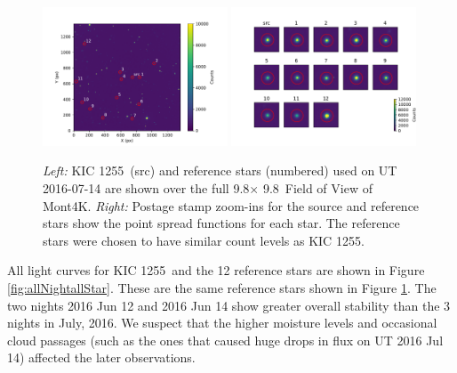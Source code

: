 \documentclass[preprint]{aastex61}
\newcommand{\shStar}{KIC 1255}
\begin{document}
\begin{figure}
\begin{centering}
\includegraphics[width=0.49\textwidth]{images/ut2016_07_14_clouds/figure_index_152.pdf}
\includegraphics[width=0.49\textwidth]{images/stamps_kic1255_UT2016_07_14.pdf}
\caption{{\it Left:} \shStar\ (src) and reference stars (numbered) used on UT 2016-07-14 are shown over the full 9.8\arcmin $\times$ 9.8\arcmin\ Field of View of Mont4K.
{\it Right:} Postage stamp zoom-ins for the source and reference stars show the point spread functions for each star.
The reference stars were chosen to have similar count levels as \shStar.
}\label{fig:refStars}
\end{centering}
\end{figure}

All light curves for \shStar\ and the 12 reference stars are shown in Figure \ref{fig:allNightallStar}.
These are the same reference stars shown in Figure \ref{fig:refStars}.
The two nights 2016 Jun 12 and 2016 Jun 14 show greater overall stability than the 3 nights in July, 2016.
We suspect that the higher moisture levels and occasional cloud passages (such as the ones that caused huge drops in flux on UT 2016 Jul 14) affected the later observations.
\end{document}
